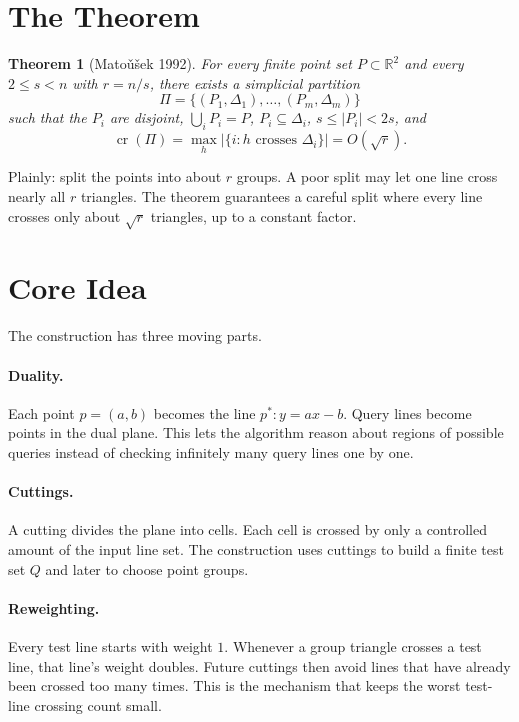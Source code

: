 \documentclass[11pt,a4paper]{article}
\newtheorem{theorem}{Theorem}
\begin{document}
\section{The Theorem}
\label{sec:theorem}

\begin{theorem}[Mato\v{u}\v{s}ek 1992]
\label{thm:partition}
For every finite point set $P \subset \mathbb{R}^2$ and every
$2 \le s < n$ with $r=n/s$, there exists a simplicial partition
\[
  \Pi=\{(P_1,\Delta_1),\ldots,(P_m,\Delta_m)\}
\]
such that the $P_i$ are disjoint, $\bigcup_i P_i=P$,
$P_i\subseteq\Delta_i$, $s\le |P_i|<2s$, and
\[
  \operatorname{cr}(\Pi)
  =
  \max_h
  \bigl|\{i:h\text{ crosses }\Delta_i\}\bigr|
  =
  O(\sqrt r).
\]
\end{theorem}

Plainly: split the points into about $r$ groups. A poor split may let
one line cross nearly all $r$ triangles. The theorem guarantees a
careful split where every line crosses only about $\sqrt r$ triangles,
up to a constant factor.


\section{Core Idea}
\label{sec:idea}

The construction has three moving parts.

\paragraph{Duality.}
Each point $p=(a,b)$ becomes the line $p^*:y=ax-b$. Query lines become
points in the dual plane. This lets the algorithm reason about
regions of possible queries instead of checking infinitely many query
lines one by one.

\paragraph{Cuttings.}
A cutting divides the plane into cells. Each cell is crossed by only a
controlled amount of the input line set. The construction uses
cuttings to build a finite test set $Q$ and later to choose point
groups.

\paragraph{Reweighting.}
Every test line starts with weight $1$. Whenever a group triangle
crosses a test line, that line's weight doubles. Future cuttings then
avoid lines that have already been crossed too many times. This is the
mechanism that keeps the worst test-line crossing count small.
\end{document}
